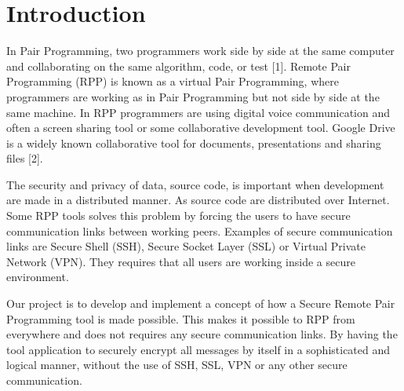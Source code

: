 \section{Introduction}

In Pair Programming, two programmers  work side by side at the same computer and collaborating on the same algorithm, code, or test [1]. Remote Pair Programming (RPP) is known as a virtual Pair Programming, where programmers are working as in Pair Programming but not side by side at the same machine. In RPP programmers are using digital voice communication and often a screen sharing tool or some collaborative development tool. Google Drive is a widely known collaborative tool for documents, presentations and sharing files [2]. 

The security and privacy of data, source code, is important when development are made in a distributed manner. As source code are distributed over Internet. Some RPP tools solves this problem by forcing the users to have secure communication links between working peers. Examples of secure communication links are Secure Shell (SSH), Secure Socket Layer (SSL) or Virtual Private Network (VPN). They requires that all users are working inside a secure environment. 

Our project is to develop and implement a concept of how a Secure Remote Pair Programming tool is made possible. This makes it possible to RPP from everywhere and does not requires any secure communication links. By having the tool application to securely encrypt all messages by itself in a sophisticated and logical manner, without the use of SSH, SSL, VPN or any other secure communication. 
